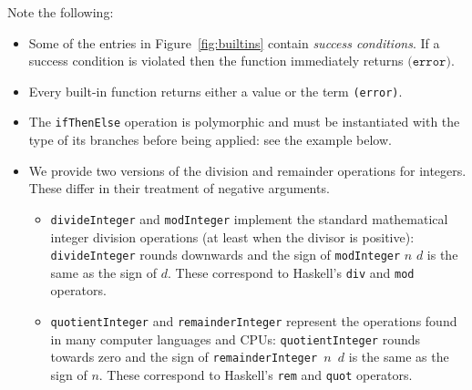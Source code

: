 \documentclass[a4paper]{article}
\newcommand{\keyword}[1]{\texttt{#1}}
\newcommand{\construct}[1]{\texttt{(} #1 \texttt{)}}
\newcommand{\errorU}{\construct{\keyword{error}}}
\begin{document}
Note the following:
\begin{itemize}
\item Some of the entries in Figure~\ref{fig:builtins}
  contain \textit{success conditions}.  If a success condition is
  violated then the function immediately returns $\errorU$.

\item Every built-in function returns either a value or the term \texttt{(error)}.

\item The \texttt{ifThenElse} operation is polymorphic and must be instantiated
    with the type of its branches before being applied: see the example below.

\item We provide two versions of the division and remainder operations
  for integers.  These differ in their treatment of negative
  arguments.

  \begin{itemize}

  \item \texttt{divideInteger} and \texttt{modInteger} implement the
    standard mathematical integer division operations (at least when
    the divisor is positive): \texttt{divideInteger} rounds
    downwards and the sign of \texttt{modInteger} $n$ $d$ is the same
    as the sign of $d$.  These correspond to Haskell's \texttt{div}
    and \texttt{mod} operators.

  \item \texttt{quotientInteger} and \texttt{remainderInteger}
    represent the operations found in many computer languages and
    CPUs: \texttt{quotientInteger} rounds towards zero and the sign
    of \texttt{remainderInteger $n$ $d$} is the same as the sign of
    $n$.  These correspond to Haskell's \texttt{rem} and \texttt{quot}
    operators.  \end{itemize}


%
%

\end{itemize}

\end{document}
